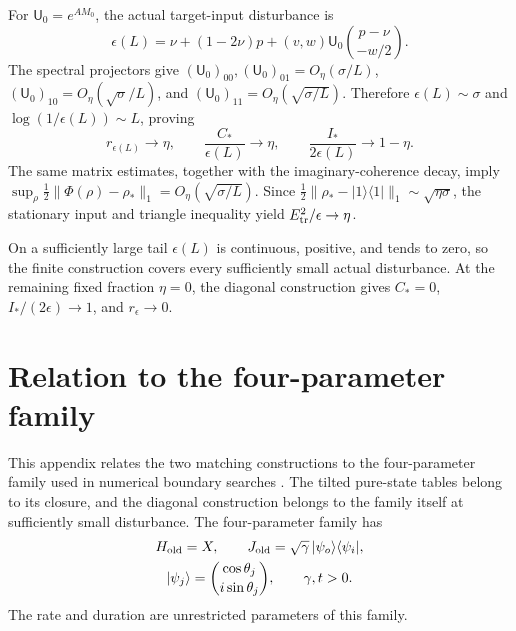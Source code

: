 \documentclass[aps,pra,reprint,amsmath,amssymb,nofootinbib,floatfix,longbibliography]{revtex4-2}
\theoremstyle{aps}
\newcommand{\eps}{\epsilon}
\newcommand{\ket}[1]{|#1\rangle}
\newcommand{\bra}[1]{\langle#1|}
\newcommand{\proj}[1]{|#1\rangle\langle#1|}
\begin{document}
For $\mathsf U_0=e^{AM_0}$, the actual target-input disturbance is
\begin{equation}\label{eq:fraction-actual}
 \eps(L)=\nu+(1-2\nu)p+(v,w)\mathsf U_0\binom{p-\nu}{-w/2}.
\end{equation}
The spectral projectors give $(\mathsf U_0)_{00},(\mathsf U_0)_{01}=O_\eta(\sigma/L)$, $(\mathsf U_0)_{10}=O_\eta(\sqrt\sigma/L)$, and $(\mathsf U_0)_{11}=O_\eta(\sqrt{\sigma/L})$. Therefore $\eps(L)\sim\sigma$ and $\log(1/\eps(L))\sim L$, proving
\begin{equation}\label{eq:fraction-matching}
 r_{\eps(L)}\to\eta,\qquad
 \frac{C_*}{\eps(L)}\to\eta,\qquad
 \frac{I_*}{2\eps(L)}\to1-\eta.
\end{equation}
The same matrix estimates, together with the imaginary-coherence decay, imply
$\sup_\rho\tfrac12\|\Phi(\rho)-\rho_*\|_1=O_\eta(\sqrt{\sigma/L})$.
Since $\tfrac12\|\rho_*-\proj1\|_1\sim\sqrt{\eta\sigma}$, the stationary input and triangle inequality yield $E_{\rm tr}^2/\eps\to\eta$.

On a sufficiently large tail $\eps(L)$ is continuous, positive, and tends to zero, so the finite construction covers every sufficiently small actual disturbance. At the remaining fixed fraction $\eta=0$, the diagonal construction gives $C_*=0$, $I_*/(2\eps)\to1$, and $r_\eps\to0$.

\section{Relation to the four-parameter family}\label{app:prior-family}

This appendix relates the two matching constructions to the four-parameter family used in numerical boundary searches \cite{Shahbeigi2024}. The tilted pure-state tables belong to its closure, and the diagonal construction belongs to the family itself at sufficiently small disturbance. The four-parameter family has
\begin{equation}\label{eq:prior-family}
 \begin{gathered}
 H_{\rm old}=X,\qquad
 J_{\rm old}=\sqrt\gamma\,\ket{\psi_o}\bra{\psi_i},\\
 \ket{\psi_j}=\binom{\cos\theta_j}{i\sin\theta_j},\qquad \gamma,t>0.
 \end{gathered}
\end{equation}
The rate and duration are unrestricted parameters of this family.
\end{document}
